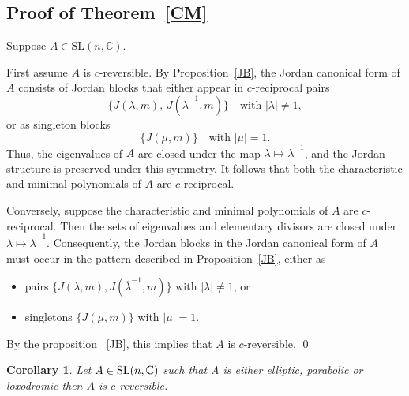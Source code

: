 \documentclass[11pt]{amsart}
\numberwithin{equation}{section}
\theoremstyle{plain}
\newtheorem{cor}[theorem]{Corollary}
\theoremstyle{definition}
\newcommand{\thmref}[1]{Theorem~\ref{#1}}
\numberwithin{equation}{section}
\def \SL{ {\rm SL}}
\begin{document}
    \subsection*{Proof of \thmref{CM}}

Suppose \( A \in \mathrm{SL}(n, \mathbb{C}) \).

First assume \( A \) is \( c \)-reversible. By Proposition~\ref{JB}, the Jordan canonical form of \( A \) consists of Jordan blocks that either appear in \( c \)-reciprocal pairs
  \[
  \{ J(\lambda, m),\, J(\overline{\lambda}^{-1}, m) \}
  \quad \text{with } |\lambda| \ne 1,
  \]
  or as singleton blocks
  \[
  \{ J(\mu, m) \}
  \quad \text{with } |\mu| = 1.
  \]
  Thus, the eigenvalues of \( A \) are closed under the map \( \lambda \mapsto \overline{\lambda}^{-1} \), and the Jordan structure is preserved under this symmetry. It follows that both the characteristic and minimal polynomials of \( A \) are \( c \)-reciprocal.

  \medskip Conversely, suppose the characteristic and minimal polynomials of \( A \) are \( c \)-reciprocal. Then the sets of eigenvalues and elementary divisors are closed under \( \lambda \mapsto \overline{\lambda}^{-1} \). Consequently, the Jordan blocks in the Jordan canonical form of \( A \) must occur in the pattern described in Proposition~\ref{JB}, either as
  \begin{itemize}
      \item pairs \( \{ J(\lambda, m), J(\overline{\lambda}^{-1}, m) \} \) with \( |\lambda| \ne 1 \), or
      \item singletons \( \{ J(\mu, m) \} \) with \( |\mu| = 1 \).
  \end{itemize}
  By the proposition ~\ref{JB}, this implies that \( A \) is \( c \)-reversible. \qed
  \\
  \begin{cor}\label{EPL}
      Let $A\in \SL(n,\mathbb{ C})$ such that A is either elliptic, parabolic or loxodromic then $A$ is $c$-reversible.
  \end{cor}
  
\end{document}
